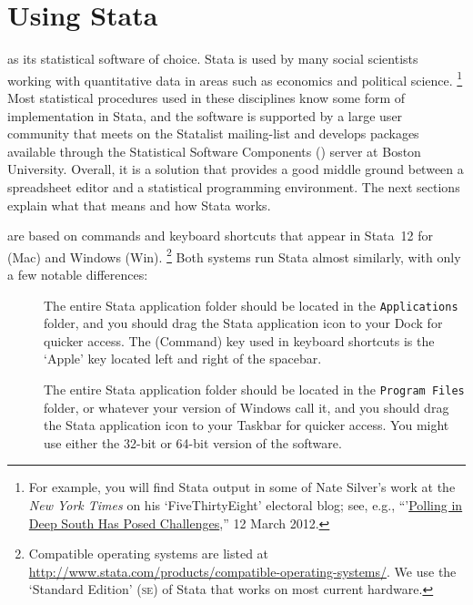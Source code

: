 %
%
\section{Using Stata}%
	\label{sec:stata}%
	
	 as its statistical software of choice. Stata is used by many social scientists working with quantitative data in areas such as economics and political science.%
 	\footnote{For example, you will find Stata output in some of Nate Silver's work at the \emph{New York Times} on his `FiveThirtyEight' electoral blog; see, e.g., ``'\href{http://fivethirtyeight.blogs.nytimes.com/2012/03/12/polling-in-deep-south-has-posed-challenges/}{Polling in Deep South Has Posed Challenges},'' 12 March 2012.} %
	Most statistical procedures used in these disciplines know some form of implementation in Stata, and the software is supported by a large user community that meets on the Statalist mailing-list and develops packages available through the Statistical Software Components (\SSC) server at Boston University. Overall, it is a solution that provides a good middle ground between a spreadsheet editor and a statistical programming environment. The next sections explain what that means and how Stata works.%

 are based on commands and keyboard shortcuts that appear in Stata~12 for \OSX (Mac) and Windows (Win).%
		\footnote{Compatible operating systems are listed at %
		\url{http://www.stata.com/products/compatible-operating-systems/}. %
		We use the `Standard Edition' (\textsc{se}) of Stata that works on most current hardware.} %
		Both systems run Stata almost similarly, with only a few notable differences:%
		
	\begin{description}

		\item[] %
		The entire Stata application folder should be located in the \texttt{Applications} folder, and you should drag the Stata application icon to your Dock for quicker access. The  (Command) key used in keyboard shortcuts is the `Apple' key located left and right of the spacebar.%

		\item[] %
		The entire Stata application folder should be located in the \texttt{Program Files} folder, or whatever your version of Windows call it, and you should drag the Stata application icon to your Taskbar for quicker access. You might use either the 32-bit or 64-bit version of the software.%

	\end{description}

